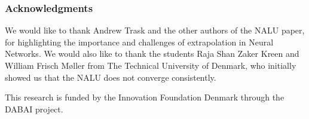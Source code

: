 \documentclass{article}
\begin{document}
\begin{abstract}
\end{abstract}







\clearpage
\ifdefined\nonanonymous
\subsubsection*{Acknowledgments}
We would like to thank Andrew Trask and the other authors of the NALU paper, for highlighting the importance and challenges of extrapolation in Neural Networks. We would also like to thank the students Raja Shan Zaker Kreen and William Frisch Møller from The Technical University of Denmark, who initially showed us that the NALU does not converge consistently. 

This research is funded by the Innovation Foundation Denmark through the DABAI project.
\fi




\newpage
\appendix

\clearpage

\clearpage

\clearpage

\clearpage
%
\end{document}

